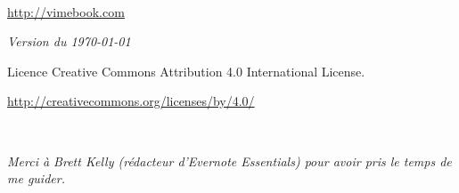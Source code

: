
\setcounter{tocdepth}{1}



\frontmatter

\maketitle

\newpage
\begin{fullwidth}
~\vfill
\thispagestyle{empty}
\setlength{\parindent}{0pt}
\setlength{\parskip}{\baselineskip}

\par{}

\par \url{http://vimebook.com}
\par\textit{Version du  \today}
\par{Licence  Creative Commons Attribution 4.0 International License.}
\par{\url{http://creativecommons.org/licenses/by/4.0/}}

\end{fullwidth}

\tableofcontents


\cleardoublepage
~\vfill
\begin{doublespace}
\noindent\fontsize{18}{22}\selectfont\itshape
\nohyphenation
Merci à Brett Kelly (rédacteur d'Evernote Essentials) pour avoir pris le temps de me guider.
\end{doublespace}
\vfill
\vfill

\cleardoublepage



\mainmatter









\listoffigures

\printindex



